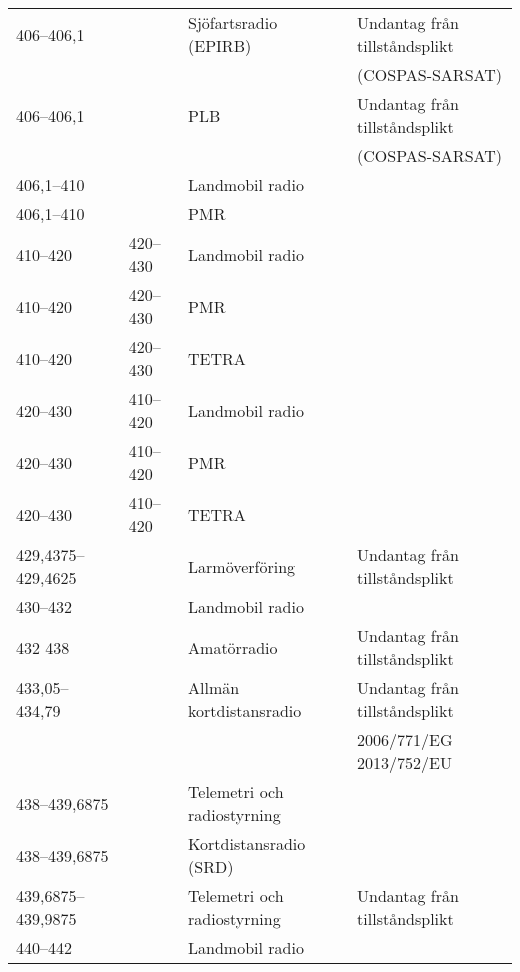 \documentclass[10pt,swedish,a4paper,twoside]{article}
\begin{document}
\begin{landscape}
\begin{longtable}{llll}
	406--406,1         &                 & Sjöfartsradio (EPIRB)       & Undantag från tillståndsplikt   \\
	                   &                 &                             & (COSPAS-SARSAT)                 \\
	406--406,1         &                 & PLB                         & Undantag från tillståndsplikt   \\
	                   &                 &                             & (COSPAS-SARSAT)                 \\
	406,1--410         &                 & Landmobil radio             &  \\
	406,1--410         &                 & PMR                         &  \\
	410--420           & 420--430        & Landmobil radio             &  \\
	410--420           & 420--430        & PMR                         &  \\
	410--420           & 420--430        & TETRA                       &  \\
	420--430           & 410--420        & Landmobil radio             &  \\
	420--430           & 410--420        & PMR                         &  \\
	420--430           & 410--420        & TETRA                       &  \\
	429,4375--429,4625 &                 & Larmöverföring              & Undantag från tillståndsplikt   \\
	430--432           &                 & Landmobil radio             &  \\
	432	438            &                 & Amatörradio                 & Undantag från tillståndsplikt   \\
	433,05--434,79     &                 & Allmän kortdistansradio     & Undantag från tillståndsplikt   \\
	                   &                 &                             & 2006/771/EG 2013/752/EU         \\
	438--439,6875      &                 & Telemetri och radiostyrning &  \\
	438--439,6875      &                 & Kortdistansradio (SRD)      &  \\
	439,6875--439,9875 &                 & Telemetri och radiostyrning & Undantag från tillståndsplikt   \\
	440--442           &                 & Landmobil radio             &  \\

\end{longtable}
\end{landscape}
\end{document}
